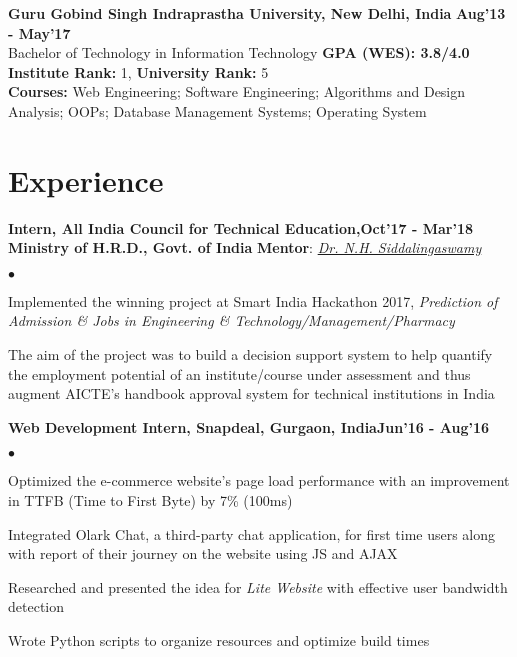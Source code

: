 \documentclass[margin,line]{res}
\newenvironment{list2}{
  \begin{list}{$\bullet$}{%
      \setlength{\itemsep}{0in}
      \setlength{\parsep}{0in} \setlength{\parskip}{0in}
      \setlength{\topsep}{0in} \setlength{\partopsep}{0in}
      \setlength{\leftmargin}{0.2in}}}{\end{list}}
\begin{document}
\begin{resume}
{\bf Guru Gobind Singh Indraprastha University, New Delhi, India} \hfill {\bf Aug'13 - May'17}\\
Bachelor of Technology in Information Technology \hfill {\bf GPA (WES): 3.8/4.0}\\
{\bf Institute Rank: }1, {\bf University Rank: }5\\
{\bf Courses:} Web Engineering; Software Engineering; Algorithms and Design Analysis; OOPs; Database Management Systems; Operating System 

\section{\sc Experience}
{\bf Intern, All India Council for Technical Education,}\hfill {\bf Oct'17 - Mar'18}\\  
{\bf Ministry of H.R.D., Govt. of India} \hfill {\bf Mentor}: {\href{https://www.aicte-india.org/leadership/dr-nh-siddalingaswamy}{\it Dr. N.H. Siddalingaswamy}}

\begin{list2}
  \item Implemented the winning project at Smart India Hackathon 2017, {\it Prediction of Admission \& Jobs in Engineering \& Technology/Management/Pharmacy}
  \item The aim of the project was to build a decision support system to help quantify the employment
potential of an institute/course under assessment and thus augment AICTE’s handbook approval system for technical institutions in India
\end{list2}
{\bf Web Development Intern, Snapdeal, Gurgaon, India}\hfill {\bf Jun'16 - Aug'16}

\begin{list2}
  \item Optimized the e-commerce website's page load performance with an improvement in TTFB (Time to First Byte) by 7\% (100ms) 
  \item Integrated Olark Chat, a third-party chat application, for first time users along with report of their journey on the website using JS and AJAX
  \item Researched and presented the idea for {\it Lite Website} with effective user bandwidth detection 
  \item Wrote Python scripts to organize resources and optimize build times
\end{list2}



\end{resume}
\end{document}
